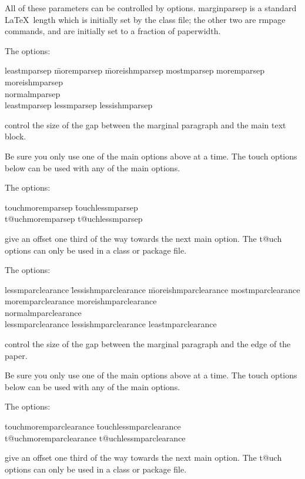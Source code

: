 \documentclass[11pt,loose,twoside,touchwider,longish,
                      noheaders,a4paper,notstdmargins]{report}
\DeclareRobustCommand*{\comname}[1]{{\ttfamily\makeatletter\bs #1\makeatother}}
\newcommand*{\classname}[1]{{\ttfamily #1}}
\newcommand*{\optname}[1]{{\ttfamily #1}}
\newcommand*{\rmpage}{\classname{rmpage}\xspace}
\begin{document}
All of these parameters can be controlled by options.
\comname{marginparsep} is a standard \LaTeX\ length which is initially
set by the class file; the other two are \rmpage commands, and are
initially set to a fraction of \comname{paperwidth}.

The options:
\begin{tabbing}
\optname{leastmparsep} \= \optname{moremparsep} \=
\optname{moreishmparsep} \kill
\optname{mostmparsep} \> \optname{moremparsep} \>
\optname{moreishmparsep} \\
\optname{normalmparsep} \\
\optname{leastmparsep} \> \optname{lessmparsep} \>
\optname{lessishmparsep}
\end{tabbing}
control the size of the gap between the marginal paragraph and the
main text block.

Be sure you only use one of the main options above at a time.  The
\optname{touch} options below can be used with any of the main options.

The options:
\begin{tabbing}
\optname{touchmoremparsep} \= \optname{touchlessmparsep} \\
\optname{t@uchmoremparsep} \> \optname{t@uchlessmparsep}
\end{tabbing}
give an offset one third of the way towards the next main option.  The
\optname{t@uch} options can only be used in a class or package file.

The options:
\begin{tabbing}
\optname{lessmparclearance} \= \optname{lessishmparclearance} \=
\optname{moreishmparclearance}\kill
\optname{mostmparclearance} \> \optname{moremparclearance} \>
\optname{moreishmparclearance}\\
\optname{normalmparclearance} \\
\optname{lessmparclearance} \> \optname{lessishmparclearance} \>
\optname{leastmparclearance}
\end{tabbing}
control the size of the gap between the marginal paragraph and the
edge of the paper.

Be sure you only use one of the main options above at a time.  The
\optname{touch} options below can be used with any of the main options.

The options:
\begin{tabbing}
\optname{touchmoremparclearance} \= \optname{touchlessmparclearance} \\
\optname{t@uchmoremparclearance} \> \optname{t@uchlessmparclearance}
\end{tabbing}
give an offset one third of the way towards the next main option.  The
\optname{t@uch} options can only be used in a class or package file.
\end{document}
